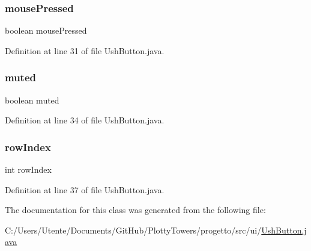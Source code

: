 \subsubsection{\texorpdfstring{mouse\+Pressed}{mousePressed}}
{\footnotesize\ttfamily boolean mouse\+Pressed\hspace{0.3cm}{\ttfamily [private]}}



Definition at line 31 of file Ush\+Button.\+java.

\mbox{\label{classui_1_1_ush_button_a1d5ea61013609113129f4a6aaa99c5cd}} 
\subsubsection{\texorpdfstring{muted}{muted}}
{\footnotesize\ttfamily boolean muted\hspace{0.3cm}{\ttfamily [private]}}



Definition at line 34 of file Ush\+Button.\+java.

\mbox{\label{classui_1_1_ush_button_aa472bc4708470ef0afc61d3c18896ec9}} 
\subsubsection{\texorpdfstring{row\+Index}{rowIndex}}
{\footnotesize\ttfamily int row\+Index\hspace{0.3cm}{\ttfamily [private]}}



Definition at line 37 of file Ush\+Button.\+java.



The documentation for this class was generated from the following file\+:\begin{DoxyCompactItemize}
\item 
C\+:/\+Users/\+Utente/\+Documents/\+Git\+Hub/\+Plotty\+Towers/progetto/src/ui/\hyperlink{_ush_button_8java}{Ush\+Button.\+java}\end{DoxyCompactItemize}
